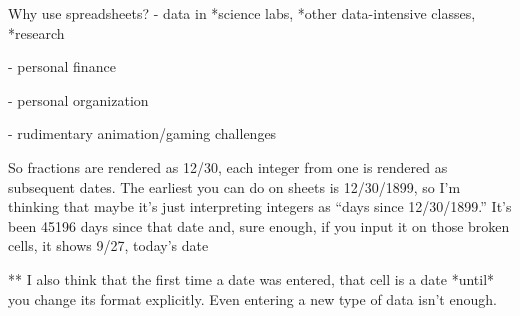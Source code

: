 Why use spreadsheets?
- data in 
     *science labs, 
     *other data-intensive classes,
     *research
     
- personal finance

- personal organization

- rudimentary animation/gaming challenges

So fractions are rendered as 12/30, each integer from one is rendered as subsequent dates. The earliest you can do on sheets is 12/30/1899, so I’m thinking that maybe it’s just interpreting integers as “days since 12/30/1899.” It’s been 45196 days since that date and, sure enough, if you input it on those broken cells, it shows 9/27, today’s date

** I also think that the first time a date was entered, that cell is a date *until* you change its format explicitly. Even entering a new type of data isn't enough.